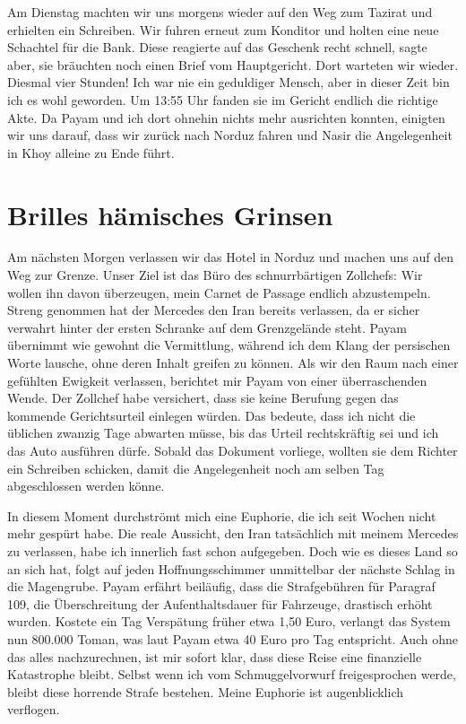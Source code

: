 Am Dienstag machten wir uns morgens wieder auf den Weg zum Tazirat und erhielten ein Schreiben. Wir fuhren erneut zum Konditor und holten eine neue Schachtel für die Bank. Diese reagierte auf das Geschenk recht schnell, sagte aber, sie bräuchten noch einen Brief vom Hauptgericht. Dort warteten wir wieder. Diesmal vier Stunden! Ich war nie ein geduldiger Mensch, aber in dieser Zeit bin ich es wohl geworden. Um 13:55 Uhr fanden sie im Gericht endlich die richtige Akte. Da Payam und ich dort ohnehin nichts mehr ausrichten konnten, einigten wir uns darauf, dass wir zurück nach Norduz fahren und Nasir die Angelegenheit in Khoy alleine zu Ende führt.

\chapter*{Brilles hämisches Grinsen}

Am nächsten Morgen verlassen wir das Hotel in Norduz und machen uns auf den Weg zur Grenze. Unser Ziel ist das Büro des schnurrbärtigen Zollchefs: Wir wollen ihn davon überzeugen, mein Carnet de Passage endlich abzustempeln. Streng genommen hat der Mercedes den Iran bereits verlassen, da er sicher verwahrt hinter der ersten Schranke auf dem Grenzgelände steht. Payam übernimmt wie gewohnt die Vermittlung, während ich dem Klang der persischen Worte lausche, ohne deren Inhalt greifen zu können. Als wir den Raum nach einer gefühlten Ewigkeit verlassen, berichtet mir Payam von einer überraschenden Wende. Der Zollchef habe versichert, dass sie keine Berufung gegen das kommende Gerichtsurteil einlegen würden. Das bedeute, dass ich nicht die üblichen zwanzig Tage abwarten müsse, bis das Urteil rechtskräftig sei und ich das Auto ausführen dürfe. Sobald das Dokument vorliege, wollten sie dem Richter ein Schreiben schicken, damit die Angelegenheit noch am selben Tag abgeschlossen werden könne.

In diesem Moment durchströmt mich eine Euphorie, die ich seit Wochen nicht mehr gespürt habe. Die reale Aussicht, den Iran tatsächlich mit meinem Mercedes zu verlassen, habe ich innerlich fast schon aufgegeben. Doch wie es dieses Land so an sich hat, folgt auf jeden Hoffnungsschimmer unmittelbar der nächste Schlag in die Magengrube. Payam erfährt beiläufig, dass die Strafgebühren für Paragraf 109, die Überschreitung der Aufenthaltsdauer für Fahrzeuge, drastisch erhöht wurden. Kostete ein Tag Verspätung früher etwa 1,50 Euro, verlangt das System nun 800.000 Toman, was laut Payam etwa 40 Euro pro Tag entspricht. Auch ohne das alles nachzurechnen, ist mir sofort klar, dass diese Reise eine finanzielle Katastrophe bleibt. Selbst wenn ich vom Schmuggelvorwurf freigesprochen werde, bleibt diese horrende Strafe bestehen. Meine Euphorie ist augenblicklich verflogen.

